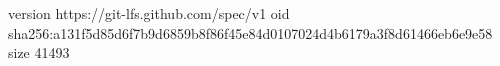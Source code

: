 version https://git-lfs.github.com/spec/v1
oid sha256:a131f5d85d6f7b9d6859b8f86f45e84d0107024d4b6179a3f8d61466eb6e9e58
size 41493

